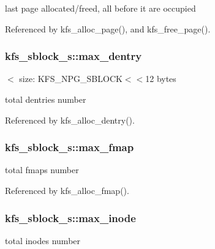 last page allocated/freed, all before it are occupied 



Referenced by kfs\-\_\-alloc\-\_\-page(), and kfs\-\_\-free\-\_\-page().

\hypertarget{structkfs__sblock__s_a8821a5865dacd4eea0bcae64e23b3aa5}{
\subsubsection[{max\-\_\-dentry}]{ kfs\-\_\-sblock\-\_\-s\-::max\-\_\-dentry}}\label{structkfs__sblock__s_a8821a5865dacd4eea0bcae64e23b3aa5}


$<$ size\-: K\-F\-S\-\_\-\-N\-P\-G\-\_\-\-S\-B\-L\-O\-C\-K$<$$<$12 bytes 

total dentries number 

Referenced by kfs\-\_\-alloc\-\_\-dentry().

\hypertarget{structkfs__sblock__s_a5254da868c0d1d63a4aba34d19ff9b04}{
\subsubsection[{max\-\_\-fmap}]{ kfs\-\_\-sblock\-\_\-s\-::max\-\_\-fmap}}\label{structkfs__sblock__s_a5254da868c0d1d63a4aba34d19ff9b04}


total fmaps number 



Referenced by kfs\-\_\-alloc\-\_\-fmap().

\hypertarget{structkfs__sblock__s_a50bd71d628473a6b77c6b2512f6742da}{
\subsubsection[{max\-\_\-inode}]{ kfs\-\_\-sblock\-\_\-s\-::max\-\_\-inode}}\label{structkfs__sblock__s_a50bd71d628473a6b77c6b2512f6742da}


total inodes number 



